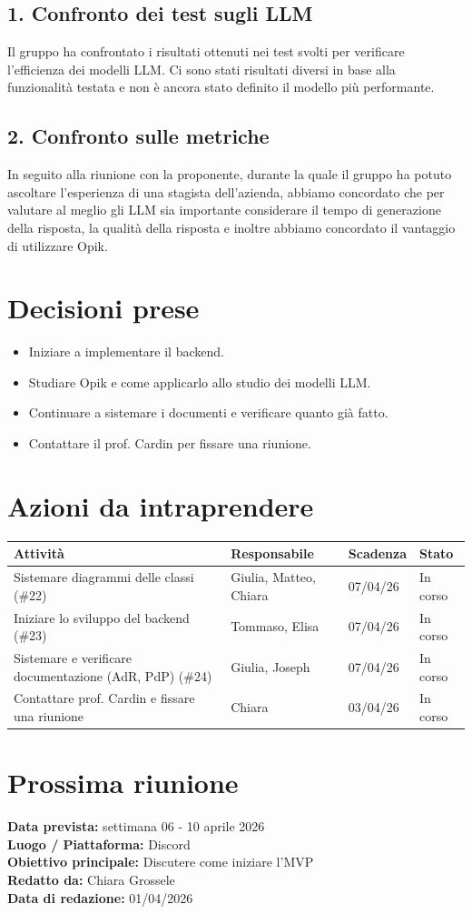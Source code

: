 \documentclass[a4paper,12pt]{article}
\begin{document}
\subsection*{1. Confronto dei test sugli LLM}
Il gruppo ha confrontato i risultati ottenuti nei test svolti per verificare l'efficienza dei modelli LLM. Ci sono stati risultati diversi in base alla funzionalità testata e non è ancora stato definito il modello più performante.

\subsection*{2. Confronto sulle metriche}
In seguito alla riunione con la proponente, durante la quale il gruppo ha potuto ascoltare l'esperienza di una stagista dell'azienda, abbiamo concordato che per valutare al meglio gli LLM sia importante considerare il tempo di generazione della risposta, la qualità della risposta e inoltre abbiamo concordato il vantaggio di utilizzare Opik.

\section*{Decisioni prese}
\begin{itemize}
    \item Iniziare a implementare il backend.
    \item Studiare Opik e come applicarlo allo studio dei modelli LLM.
    \item Continuare a sistemare i documenti e verificare quanto già fatto.
    \item Contattare il prof. Cardin per fissare una riunione.
\end{itemize}

\section*{Azioni da intraprendere}
\begin{longtable}{|p{}|p{}|p{}|p{}|}
\hline
\textbf{Attività} & \textbf{Responsabile} & \textbf{Scadenza} & \textbf{Stato} \\ \hline
Sistemare diagrammi delle classi (\#22)& Giulia, Matteo, Chiara & 07/04/26 & In corso \\ \hline
Iniziare lo sviluppo del backend (\#23) & Tommaso, Elisa & 07/04/26 & In corso \\ \hline
Sistemare e verificare documentazione (AdR, PdP) (\#24)& Giulia, Joseph & 07/04/26 & In corso \\ \hline
Contattare prof. Cardin e fissare una riunione & Chiara & 03/04/26 & In corso\\ \hline
\end{longtable}


\section*{Prossima riunione}
\textbf{Data prevista:} settimana 06 - 10 aprile 2026\\
\textbf{Luogo / Piattaforma:} Discord \\
\textbf{Obiettivo principale:} Discutere come iniziare l'MVP\\



\textbf{Redatto da:} Chiara Grossele \\
\textbf{Data di redazione:} 01/04/2026
\end{document}
